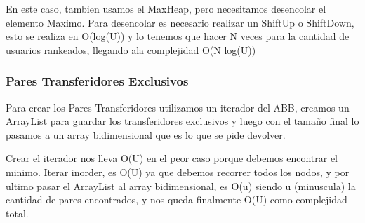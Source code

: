 \documentclass[11pt,a4paper]{article}
\begin{document}
En este caso, tambien usamos el MaxHeap, pero necesitamos desencolar el elemento Maximo. Para desencolar es necesario realizar un ShiftUp o ShiftDown, esto se realiza en O(log(U)) y lo tenemos que hacer N veces para la cantidad de usuarios rankeados, llegando ala complejidad O(N log(U))


\subsubsection{Pares Transferidores Exclusivos}
Para crear los Pares Transferidores utilizamos un iterador del ABB, creamos un ArrayList para guardar los transferidores exclusivos y luego con el tamaño final lo pasamos a un array bidimensional que es lo que se pide devolver.

Crear el iterador nos lleva O(U) en el peor caso porque debemos encontrar el minimo. Iterar inorder, es O(U) ya que debemos recorrer todos los nodos, y por ultimo pasar el ArrayList al array bidimensional, es O(u) siendo u (minuscula) la cantidad de pares encontrados, y nos queda finalmente O(U) como complejidad total.
\end{document}
